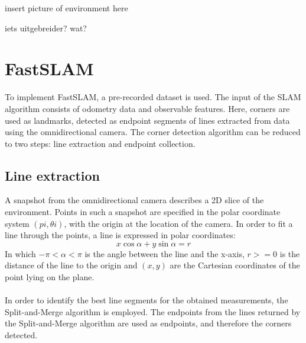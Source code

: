 \documentclass[12pt]{article}
\begin{document}
insert picture of environment here

iets uitgebreider? wat?

\section{FastSLAM}
To implement FastSLAM, a pre-recorded dataset is used. The input of the SLAM algorithm consists of odometry data and observable features. Here, corners are used as landmarks, detected as endpoint segments of lines extracted from data using the omnidirectional camera. The corner detection algorithm can be reduced to two steps: line extraction and endpoint collection.
\subsection{Line extraction}
A snapshot from the omnidirectional camera describes a 2D slice of the environment. Points in such a snapshot are specified in the polar coordinate system $(pi, {\theta}i)$, with the origin at the location of the camera. In order to fit a line through the points, a line is expressed in polar coordinates:
\begin{equation}
	x\cos{\alpha} + y\sin{\alpha} = r
\end{equation}
In which $-\pi < \alpha < \pi$ is the angle between the line and the x-axis, $r >= 0$ is the distance of the line to the origin and $(x, y)$ are the Cartesian coordinates of the point lying on the plane. \\ \\
In order to identify the best line segments for the obtained measurements, the Split-and-Merge algorithm is employed. The endpoints from the lines returned by the Split-and-Merge algorithm are used as endpoints, and therefore the corners detected.
\end{document}
